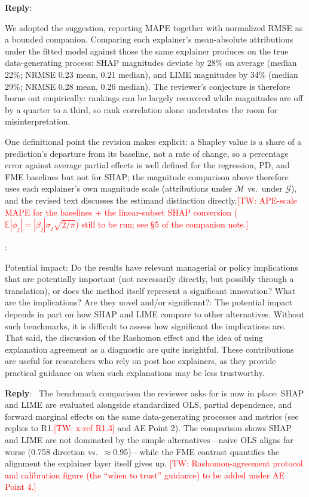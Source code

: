 \documentclass[11pt]{article}
\newcommand{\tw}[1]{\textcolor{red}{[TW: #1]}}
\newcounter{se}[section]
\newcounter{reviewer}
\newcounter{point}[reviewer]
\renewcommand{\thepoint}{R\,\thereviewer.\arabic{point}}
\newenvironment{point}{
    \refstepcounter{point} \bigskip \noindent {\textbf{\thepoint}}: \rmfamily \itshape
}{\medskip}
\newenvironment{reply}
 {\par\medskip \noindent \begin{sf}\textbf{Reply}:\ }
 {\medskip \end{sf}}
\begin{document}
\begin{reply}
{\color{red}
We adopted the suggestion, reporting MAPE together with normalized RMSE as a bounded companion. Comparing each explainer's mean-absolute attributions under the fitted model against those the same explainer produces on the true data-generating process: SHAP magnitudes deviate by 28\% on average (median 22\%; NRMSE 0.23 mean, 0.21 median), and LIME magnitudes by 34\% (median 29\%; NRMSE 0.28 mean, 0.26 median). The reviewer's conjecture is therefore borne out empirically: rankings can be largely recovered while magnitudes are off by a quarter to a third, so rank correlation alone understates the room for misinterpretation.

One definitional point the revision makes explicit: a Shapley value is a share of a prediction's departure from its baseline, not a rate of change, so a percentage error against average partial effects is well defined for the regression, PD, and FME baselines but not for SHAP; the magnitude comparison above therefore uses each explainer's own magnitude scale (attributions under $\mathcal{M}$ vs.\ under $\mathcal{G}$), and the revised text discusses the estimand distinction directly.\tw{APE-scale MAPE for the baselines + the linear-subset SHAP conversion ($\mathbb{E}|\phi_j| = |\beta_j|\sigma_j\sqrt{2/\pi}$) still to be run; see \S5 of the companion note.}
}
\end{reply}


\begin{point}
Potential impact: Do the results have relevant managerial or policy implications that are potentially important (not necessarily directly, but possibly through a translation), or does the method itself represent a significant innovation? What are the implications? Are they novel and/or significant?: The potential impact depends in part on how SHAP and LIME compare to other alternatives. Without such benchmarks, it is difficult to assess how significant the implications are. That said, the discussion of the Rashomon effect and the idea of using explanation agreement as a diagnostic are quite insightful. These contributions are useful for researchers who rely on post hoc explainers, as they provide practical guidance on when such explanations may be less trustworthy.
\end{point}

\begin{reply}
{\color{red}
The benchmark comparison the reviewer asks for is now in place: SHAP and LIME are evaluated alongside standardized OLS, partial dependence, and forward marginal effects on the same data-generating processes and metrics (see replies to R1.\tw{x-ref R1.3} and AE Point 2). The comparison shows SHAP and LIME are not dominated by the simple alternatives---naive OLS aligns far worse (0.758 direction vs.\ $\approx$0.95)---while the FME contrast quantifies the alignment the explainer layer itself gives up. \tw{Rashomon-agreement protocol and calibration figure (the ``when to trust'' guidance) to be added under AE Point 4.}
}
\end{reply}
\end{document}
